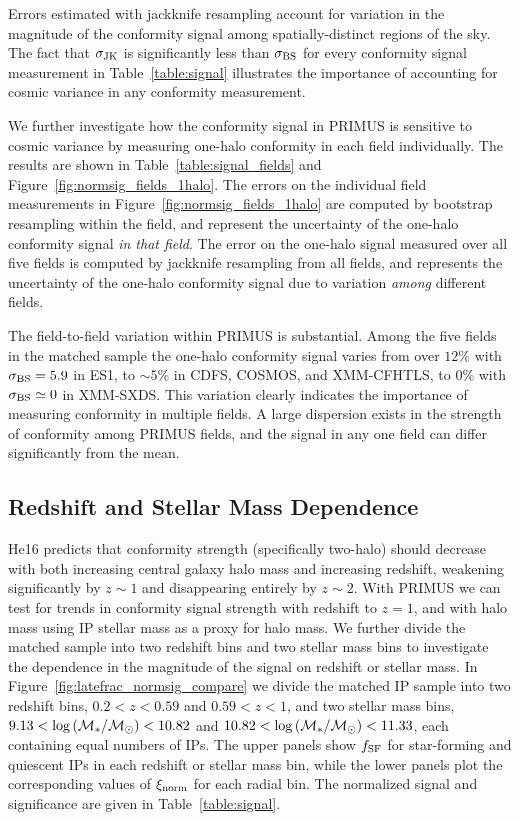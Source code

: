 

Errors estimated with jackknife resampling account for variation in the 
magnitude of the conformity signal among spatially-distinct regions of the sky.
The fact that $\sigmaJK$ is significantly less than $\sigmaBS$ for every conformity signal measurement in Table~\ref{table:signal}
illustrates the importance of accounting for cosmic variance in any conformity measurement.

We further investigate how the conformity signal in PRIMUS is sensitive to cosmic variance by measuring one-halo conformity in each field individually.
The results are shown in Table~\ref{table:signal_fields} and Figure~\ref{fig:normsig_fields_1halo}.
The errors on the individual field measurements in Figure~\ref{fig:normsig_fields_1halo} are computed by bootstrap resampling within the field, and represent the uncertainty of the one-halo conformity signal \emph{in that field}.
The error on the one-halo signal measured over all five fields is computed by jackknife resampling from all fields, and represents the uncertainty of the one-halo conformity signal due to variation \emph{among} different fields.

The field-to-field variation within PRIMUS is substantial.
Among the five fields in the matched sample the one-halo conformity signal varies from over $12\%$ with $\sigmaBS=5.9$ in ES1, to $\sim5$\% in 
CDFS, COSMOS, and XMM-CFHTLS, to $0\%$ with $\sigmaBS\simeq0$ in XMM-SXDS.
This variation clearly indicates the importance of measuring conformity in multiple fields.  A large dispersion exists in the strength of conformity among PRIMUS fields, and the signal in any one field can differ significantly from the mean.


\subsection{Redshift and Stellar Mass Dependence}\label{sec:z_mass_bins}

He16 predicts that conformity strength (specifically two-halo) should decrease with both increasing central galaxy halo mass and increasing redshift, weakening significantly by $z\sim1$ and disappearing entirely by $z\sim2$.
With PRIMUS we can test for trends in conformity signal strength with redshift to $z=1$, and with halo mass using IP stellar mass as a proxy for halo mass.
We further divide the matched sample into two redshift bins and two stellar mass bins 
to investigate the dependence in the magnitude of the signal on redshift or stellar mass.
In Figure~\ref{fig:latefrac_normsig_compare} we divide the matched IP sample into two redshift bins, ${0.2<z<0.59}$ and ${0.59<z<1}$, and two stellar mass bins, 
${9.13<\logM<10.82}$ and ${10.82<\logM<11.33}$, each containing equal numbers of IPs.
The upper panels show $\flate$ for star-forming and quiescent IPs in each redshift or stellar mass bin, while the lower panels plot the corresponding values of
$\signorm$ for each radial bin. The normalized signal and significance are given in 
Table~\ref{table:signal}.


